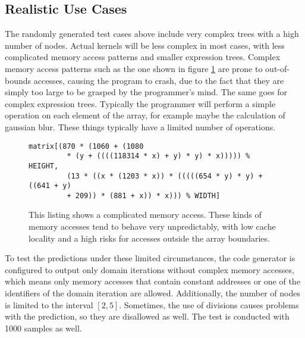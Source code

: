 \subsection{Realistic Use Cases}
\label{sect:results_results_realistic}
The randomly generated test cases above include very complex trees with a high number of nodes. Actual kernels will be less complex in most cases, with less complicated memory access patterns and smaller expression trees. Complex memory access patterns such as the one shown in figure \ref{fig:results_results_realistic_complex_access} are prone to out-of-bounds accesses, causing the program to crash, due to the fact that they are simply too large to be grasped by the programmer's mind. The same goes for complex expression trees. Typically the programmer will perform a simple operation on each element of the array, for example maybe the calculation of gaussian blur. These things typically have a limited number of operations. \\

\begin{figure}
	\lstset{language=c}
	\begin{lstlisting}
matrix[(870 * (1060 + (1080 
         * (y + ((((118314 * x) + y) * y) * x))))) % HEIGHT, 
         (13 * ((x * (1203 * x)) * (((((654 * y) * y) + ((641 + y) 
         + 209)) * (881 + x)) * x))) % WIDTH]
	\end{lstlisting}
	\caption{This listing shows a complicated memory access. These kinds of memory accesses tend to behave very unpredictably, with low cache locality and a high risks for accesses outside the array boundaries.}
	\label{fig:results_results_realistic_complex_access}
\end{figure}

To test the predictions under these limited circumstances, the code generator is configured to output only domain iterations without complex memory accesses, which means only memory accesses that contain constant addresses or one of the identifiers of the domain iteration are allowed. Additionally, the number of nodes is limited to the interval $[2,5]$. Sometimes, the use of divisions causes problems with the prediction, so they are disallowed as well. The test is conducted with 1000 samples as well. \\

